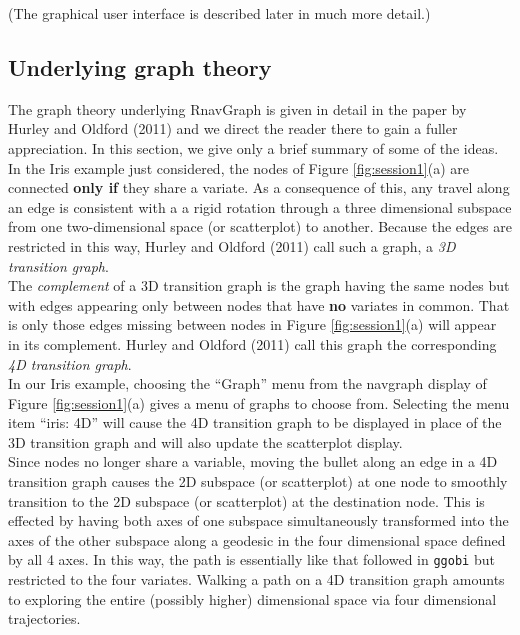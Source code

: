 \documentclass[12pt,oneside,titlepage,letter]{article}
\begin{document}
(The graphical user interface is described later in much more detail.)

\subsection{Underlying graph theory}
The graph theory underlying RnavGraph is given in detail in the paper by Hurley and Oldford (2011)
and we direct the reader there to gain a fuller appreciation.  In this section, we give only a brief summary of some of the ideas.\\

In the Iris example just considered, the nodes of Figure \ref{fig:session1}(a) are connected {\bf only if} they share a variate.  As a consequence of this, any travel along an edge is consistent with a
 a rigid rotation through a three dimensional subspace from one two-dimensional space (or scatterplot) to another.   Because the edges are restricted in this way, Hurley and Oldford (2011) call such a graph, a  {\em 3D transition graph}.\\

The {\em complement} of a 3D transition graph is the graph having the same nodes but with edges
appearing only between nodes that have {\bf no} variates in common.  That is only those edges missing between nodes in Figure \ref{fig:session1}(a) will appear in its complement.  Hurley and Oldford (2011) call this graph the corresponding {\em 4D transition graph}. \\

In our Iris example, choosing the ``Graph'' menu from the navgraph display of Figure \ref{fig:session1}(a) gives a menu of graphs to choose from.  Selecting the menu item ``iris: 4D'' will
cause the 4D transition graph to be displayed in place of the 3D transition graph and will also update the
scatterplot display.   \\

Since nodes no longer share a variable, moving the bullet along an edge in a
4D transition graph causes the 2D subspace (or scatterplot) at one node to smoothly transition
to the 2D subspace (or scatterplot) at the destination node.  This is effected by having both axes of one subspace simultaneously transformed into the axes of the other subspace along a geodesic in the four dimensional space defined by all 4 axes.   In this way, the path is essentially like that followed in \texttt{ggobi} but restricted to the four variates.  Walking a path on a 4D transition graph amounts to exploring the entire (possibly higher) dimensional space via four dimensional trajectories.\\
\end{document}

